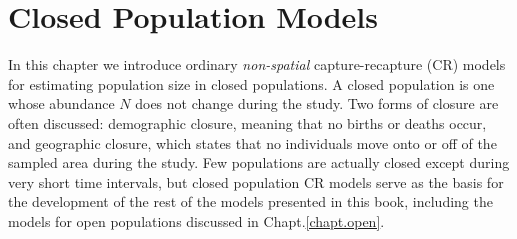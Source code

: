 \chapter{
 Closed Population Models
}
\label{chapt.closed}

\vspace{.3in}

In this chapter we introduce  ordinary {\it non-spatial} capture-recapture (CR)
models for estimating population size in closed populations. A closed
population is one whose abundance $N$ does not change during the
study. Two forms of closure are often discussed: demographic closure,
meaning that no births or deaths occur, and geographic closure, which
states that no individuals move onto or off of the sampled area during the study.
Few populations are actually closed except during very short
time intervals, but closed population CR models serve as the basis for
the development of the rest of the models presented in this book,
including the models for open populations discussed in
Chapt.\ref{chapt.open}.

